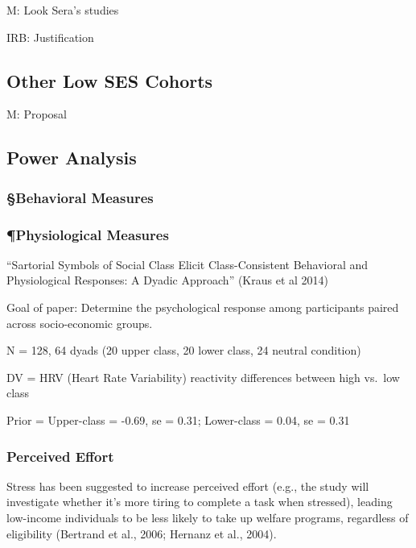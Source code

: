 \documentclass[
]{report}
\begin{document}
M: Look Sera's studies

IRB: Justification

\hypertarget{other-low-ses-cohorts}{%
\subsection{Other Low SES Cohorts}\label{other-low-ses-cohorts}}

M: Proposal

\hypertarget{power-analysis}{%
\subsection{Power Analysis}\label{power-analysis}}

\hypertarget{behavioral-measures}{%
\subsubsection{§Behavioral Measures}\label{behavioral-measures}}

\hypertarget{physiological-measures}{%
\subsubsection{¶Physiological Measures}\label{physiological-measures}}

``Sartorial Symbols of Social Class Elicit Class-Consistent Behavioral
and Physiological Responses: A Dyadic Approach'' (Kraus et al 2014)

Goal of paper: Determine the psychological response among participants
paired across socio-economic groups.

N = 128, 64 dyads (20 upper class, 20 lower class, 24 neutral condition)

DV = HRV (Heart Rate Variability) reactivity differences between high
vs.~low class

Prior = Upper-class = -0.69, se = 0.31; Lower-class = 0.04, se = 0.31

\hypertarget{perceived-effort}{%
\subsubsection{Perceived Effort}\label{perceived-effort}}

Stress has been suggested to increase perceived effort (e.g., the study
will investigate whether it's more tiring to complete a task when
stressed), leading low-income individuals to be less likely to take up
welfare programs, regardless of eligibility (Bertrand et al., 2006;
Hernanz et al., 2004).
\end{document}
